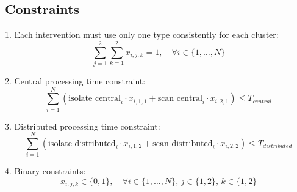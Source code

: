 \documentclass{article}
\begin{document}
\subsection*{Constraints}

1. Each intervention must use only one type consistently for each cluster:
\[
\sum_{j=1}^{2} \sum_{k=1}^{2} x_{i,j,k} = 1, \quad \forall i \in \{1, \ldots, N\}
\]

2. Central processing time constraint:
\[
\sum_{i=1}^{N} \left( \text{isolate\_central}_i \cdot x_{i,1,1} + \text{scan\_central}_i \cdot x_{i,2,1} \right) \leq T_{central}
\]

3. Distributed processing time constraint:
\[
\sum_{i=1}^{N} \left( \text{isolate\_distributed}_i \cdot x_{i,1,2} + \text{scan\_distributed}_i \cdot x_{i,2,2} \right) \leq T_{distributed}
\]

4. Binary constraints:
\[
x_{i,j,k} \in \{0, 1\}, \quad \forall i \in \{1, \ldots, N\}, \, j \in \{1, 2\}, \, k \in \{1, 2\}
\]
\end{document}
